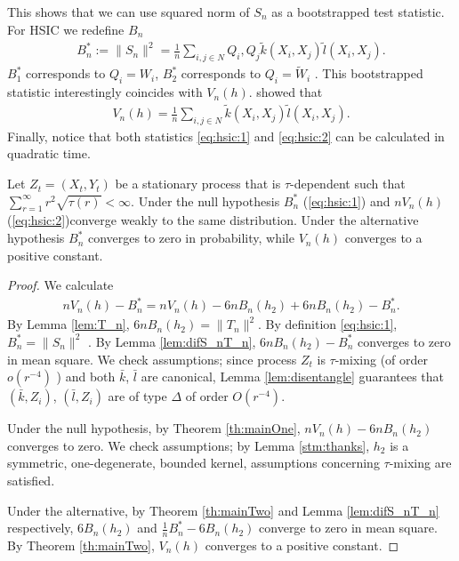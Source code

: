 This shows  that we can use squared norm of $S_n$ as a bootstrapped test statistic.  For HSIC we redefine $B_n$ 
\begin{align}
\label{eq:hsic:1}
B_n^* :=  \| S_n \|^2 = \frac 1  n \sum_{i,j \in N }Q_i, Q_j \tilde k(X_i,X_j) \tilde l(X_i,X_j).
\end{align}
$B_{1}^*$ corresponds to $Q_i=W_i$, $B_{2}^*$  corresponds to $Q_i= \tilde W_i$ . This bootstrapped statistic interestingly coincides with $V_n(h)$. \citet{gretton_kernel_2008} showed that 
\begin{align}
\label{eq:hsic:2}
V_n(h) = \frac 1  n \sum_{i,j \in N }\tilde k(X_i,X_j) \tilde l(X_i,X_j).
\end{align}
Finally, notice that both statistics \ref{eq:hsic:1} and \ref{eq:hsic:2} can be calculated in quadratic time.


\begin{proposition}
\label{prop:null}
Let  $Z_t=\left(X_t,Y_t\right)$  be a stationary process  that is $\tau$-dependent such that $\sum_{r=1}^{\infty} r^2 \sqrt{ \tau(r)} <\infty$. Under the null hypothesis  $B_n^*$ (\ref{eq:hsic:1}) and $n V_n(h)$  (\ref{eq:hsic:2})converge weakly to the same distribution. Under the alternative hypothesis $B_n^*$  converges to zero in probability, while $V_n(h)$ converges to a positive constant. 
\end{proposition}
\begin{proof}
We calculate 
\begin{align*}
 n V_n(h) - B_n^* = n V_n(h) - 6 nB_n(h_2) + 6 nB_n(h_2) -  B_n^* .
\end{align*}
 By Lemma \ref{lem:T_n},  $6 nB_n(h_2) = \| T_n \|^2$. By definition \eqref{eq:hsic:1}, $B_n^* =  \| S_n \|^2 $ .  By Lemma \ref{lem:difS_nT_n}, $6 nB_n(h_2) -  B_n^*$ converges to zero in mean square. We check assumptions; since process $Z_t$ is $\tau$-mixing (of order $o(r^{-4})$ ) and both $\bar k$, $\bar l$ are canonical, Lemma \ref{lem:disentangle} guarantees that  $(\bar k,Z_i)$, $(\bar l,Z_i)$  are of type $\varDelta$ of order $O(r^{-4})$.
 
 Under the null  hypothesis, by Theorem \ref{th:mainOne}, $n V_n(h) - 6 nB_n(h_2)$ converges to zero.  We check assumptions; by Lemma \ref{stm:thanks}, $h_2$ is a symmetric, one-degenerate, bounded kernel, assumptions concerning $\tau$-mixing are satisfied. 
 
 Under the alternative, by Theorem \ref{th:mainTwo} and  Lemma \ref{lem:difS_nT_n} respectively,  $6 B_n(h_2)$ and $\frac 1 n B_n^* -6 B_n(h_2) $ converge to zero in mean square. By Theorem \ref{th:mainTwo}, $V_n(h)$ converges to a positive constant.
 \end{proof}

